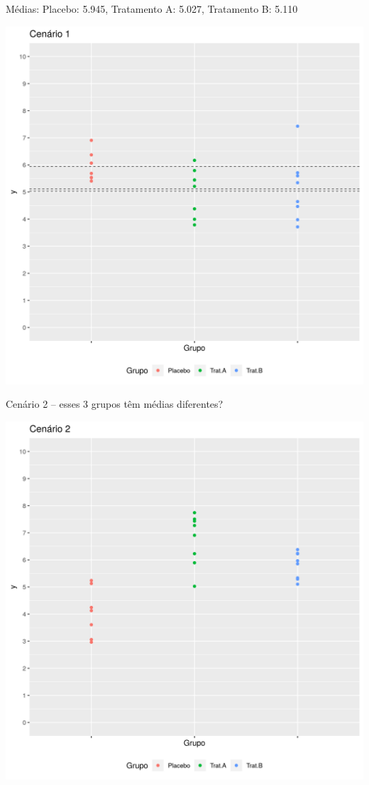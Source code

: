 \documentclass{beamer}
\begin{document}
\begin{frame}{\scriptsize Médias: Placebo: 5.945, Tratamento A: 5.027, Tratamento B: 5.110}
  \begin{center}
    \includegraphics[height=.9\textheight]{Cap13-30/cenario11_medias}

  \end{center}
\end{frame}

\begin{frame}[label=cenario2]{\scriptsize Cenário 2 -- esses 3 grupos têm médias diferentes?}
  \begin{center}
    \includegraphics[height=.9\textheight]{Cap13-30/cenario21}
  \end{center}
\end{frame}
\end{document}
